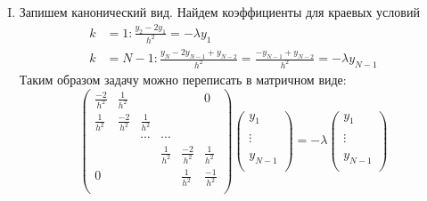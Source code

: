 \documentclass[12pt]{article}
\begin{document}
\begin{enumerate}[I.]
    \item Запишем канонический вид. Найдем коэффициенты для краевых условий
    \begin{align*}
        k &= 1: \frac{y_2 - 2y_1}{h^2} = -\lambda y_1 \\
        k &= N-1: \frac{y_N - 2y_{N-1}+y_{N-2}}{h^2} = \frac{-y_{N-1} + y_{N-2}}{h^2} = -\lambda y_{N-1}
    \end{align*}
    Таким образом задачу можно переписать в матричном виде:
    \[\left(\begin{array}{cccccc}
        \frac{-2}{h^2}& \frac{1}{h^2}  &&&& 0 \\
        \frac{1}{h^2} & \frac{-2}{h^2} & \frac{1}{h^2} &&& \\
        &&\cdots&\cdots&& \\
        &&& \frac{1}{h^2} & \frac{-2}{h^2} & \frac{1}{h^2} \\
        0 &&&               & \frac{1}{h^2}  & \frac{-1}{h^2} \\
    \end{array}\right)
    \left(\begin{array}{c}
        y_{1}\\
        \\
        \vdots\\
        \\
        y_{N-1}\\
    \end{array}\right)
    =
    -\lambda
    \left(\begin{array}{c}
        y_{1}\\
        \\
        \vdots\\
        \\
        y_{N-1}\\
    \end{array}\right)
    \]


\end{enumerate}
\end{document}
